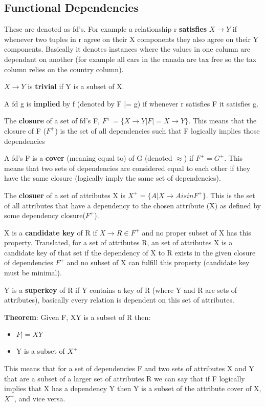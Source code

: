 \documentclass{article}
\begin{document}
\subsection*{Functional Dependencies} %
These are denoted as fd's. For example a relationship r \textbf{satisfies} $X\rightarrow Y$ if whenever two tuples in r agree on their X components they also agree on their Y components. Basically it denotes instances where the values in one column are dependant on another (for example all cars in the canada are tax free so the tax column relies on the country column).

$X\rightarrow Y$ is \textbf{trivial} if Y is a subset of X.

A fd g is \textbf{implied} by f (denoted by F |= g) if whenever r satisfies F it satisfies g.

The \textbf{closure} of a set of fd's F, $F^+ = \{X\rightarrow Y | F |= X \rightarrow Y\}$. This means that the closure of F ($F^+$) is the set of all dependencies such that F logically implies those dependencies

A fd's F is a \textbf{cover} (meaning equal to) of G (denoted $\approx$) if $F^+ = G^+$. This means that two sets of dependencies are considered equal to each other if they have the same closure (logically imply the same set of dependencies).

The \textbf{closuer} of a set of attributes X is $X^+ = \{A | X\rightarrow A is in F^+\}$. This is the set of all attributes that have a dependency to the chosen attribute (X) as defined by some dependency closure($F^+$).

X is a \textbf{candidate key} of R if $X\rightarrow R\in F^+$ and no proper subset of X has this property. Translated, for a set of attributes R, an set of attributes X is a candidate key of that set if the dependency of X to R exists in the given closure of dependencies $F^+$ and no subset of X can fulfill this property (candidate key must be minimal).

Y is a \textbf{superkey} of R if Y contains a key of R (where Y and R are sets of attributes), basically every relation is dependent on this set of attributes.

\textbf{Theorem}: Given F, XY is a subset of R then:
\begin{itemize}
    \item $F|= XY$
    \item Y is a subset of $X^+$
\end{itemize}
This means that for a set of dependencies F and two sets of attributes X and Y that are a subset of a larger set of attributes R we can say that if F logically implies that X has a dependency Y then Y is a subset of the attribute cover of X, $X^+$, and vice versa.
\end{document}
